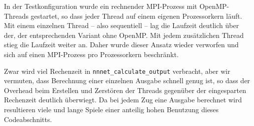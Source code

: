 In der Testkonfiguration wurde ein rechnender MPI-Prozess mit OpenMP-Threads
gestartet, so dass jeder Thread auf einem eigenen Prozessorkern läuft.  Mit
einem einzelnen Thread -- also sequentiell -- lag die Laufzeit deutlich über
der, der entsprechenden Variant ohne OpenMP.  Mit jedem zusätzlichen Thread
stieg die Laufzeit weiter an. Daher wurde dieser Ansatz wieder verworfen und
sich auf einen MPI-Prozess pro Prozessorkern beschränkt.

Zwar wird viel Rechenzeit in \texttt{nnnet\_calculate\_output} verbracht, aber
wir vermuten, dass Berechnung einer einzelnen Ausgabe schnell genug ist, so
dass der Overhead beim Erstellen und Zerstören der Threads gegenüber der
eingesparten Rechenzeit deutlich überwiegt. Da bei jedem Zug eine Ausgabe
berechnet wird resultieren viele und lange Spiele einer anteilig hohen
Benutzung dieses Codeabschnitts.
